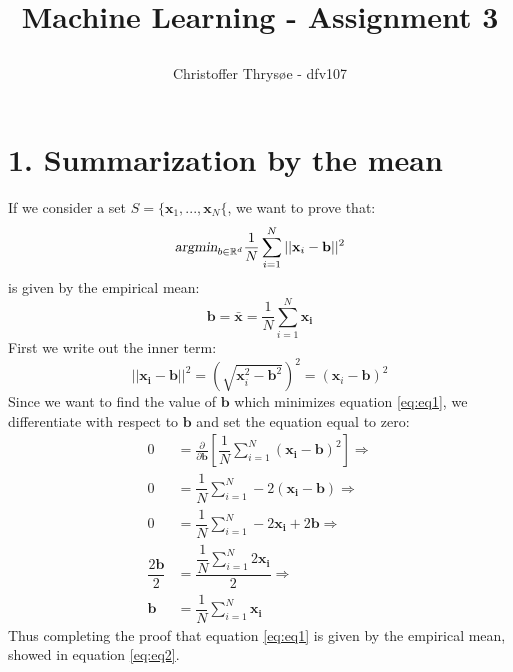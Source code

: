 \documentclass{article}
\title{
\vspace{1in}
\textmd{\textbf{Machine Learning - Assignment 3}} \\
\author{Christoffer Thrysøe - dfv107}
}
\begin{document}
\maketitle
{}
\section{1. Summarization by the mean}
If we consider a set $S = \lbrace \mathbf{x}_1,...,\mathbf{x}_N \lbrace $, we want to prove that:
\begin{equation}
\textsl{argmin}_{b \in \mathbb{R}^d} \dfrac{1}{N} \sum\limits_{i=1}^N ||\mathbf{x}_i-\mathbf{b}||^2
\label{eq:eq1}
\end{equation} 
is given by the empirical mean:
\begin{equation}
\mathbf{b} = \bar{\mathbf{x}} = \dfrac{1}{N} \sum\limits_{i=1}^N \mathbf{x_i}
\label{eq:eq2}
\end{equation}
First we write out the inner term:
\begin{equation*}
||\mathbf{x_i}-\mathbf{b}||^2 = \left( \sqrt{\mathbf{x}_i^2-\mathbf{b}^2} \right) ^2 = \left(\mathbf{x}_i - \mathbf{b} \right)^2
\end{equation*}
Since we want to find the value of $\mathbf{b}$ which minimizes equation \ref{eq:eq1}, we differentiate with respect to $\mathbf{b}$ and set the equation equal to zero:
\begin{align*}
0 &= \frac{\partial}{\partial \mathbf{b}} \left[
\dfrac{1}{N} \sum\limits_{i=1}^N \left(\mathbf{x_i}-\mathbf{b}\right)^2
\right] \Rightarrow \\
0 &= \dfrac{1}{N} \sum\limits_{i=1}^N -2 \left(\mathbf{x_i}-\mathbf{b}\right) \Rightarrow \\
0 &= \dfrac{1}{N} \sum\limits_{i=1}^N -2\mathbf{x_i} + 2\mathbf{b} \Rightarrow \\
\dfrac{2\mathbf{b}}{2} &= \dfrac{\dfrac{1}{N} \sum\limits_{i=1}^N 2\mathbf{x_i}}{2} \Rightarrow \\
\mathbf{b} &= \dfrac{1}{N} \sum\limits_{i=1}^N \mathbf{x_i}
\end{align*}
Thus completing the proof that equation \ref{eq:eq1} is given by the empirical mean, showed in equation \ref{eq:eq2}.
\end{document}
